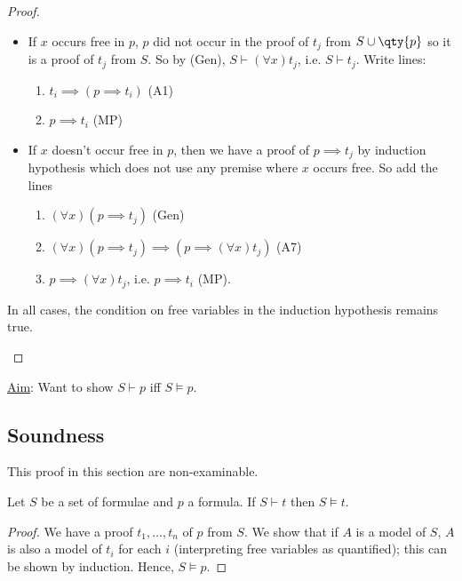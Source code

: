 \begin{proof}
\begin{itemize}
\begin{itemize}
            \item If $x$ occurs free in $p$, $p$ did not occur in the proof of $t_j$ from $S \cup \qty{p}$ so it is a proof of $t_j$ from $S$.
            So by (Gen), $S \vdash (\forall x) t_j$, i.e. $S \vdash t_j$.
            Write lines:
            \begin{enumerate}
                \item $t_i \implies (p \implies t_i)$ (A1)
                \item $p \implies t_i$ (MP)
            \end{enumerate}
            \item If $x$ doesn't occur free in $p$, then we have a proof of $p \implies t_j$ by induction hypothesis which does not use any premise where $x$ occurs free.
            So add the lines
            \begin{enumerate}
                \item $(\forall x) (p \implies t_j)$ (Gen)
                \item $(\forall x) (p \implies t_j) \implies (p \implies (\forall x) t_j)$ (A7)
                \item $p \implies (\forall x) t_j$, i.e. $p \implies t_i$ (MP).
            \end{enumerate}
        \end{itemize}

        In all cases, the condition on free variables in the induction hypothesis remains true.
    \end{itemize}
\end{proof}

\underline{Aim}: Want to show $S \vdash p$ iff $S \models p$.

\subsection{Soundness}
This proof in this section are non-examinable.

\begin{proposition}
    Let $S$ be a set of formulae and $p$ a formula.
    If $S \vdash t$ then $S \models t$.
\end{proposition}

\begin{proof}
    We have a proof $t_1, \dots, t_n$ of $p$ from $S$.
    We show that if $A$ is a model of $S$, $A$ is also a model of $t_i$ for each $i$ (interpreting free variables as quantified); this can be shown by induction.
    Hence, $S \models p$.
\end{proof}

